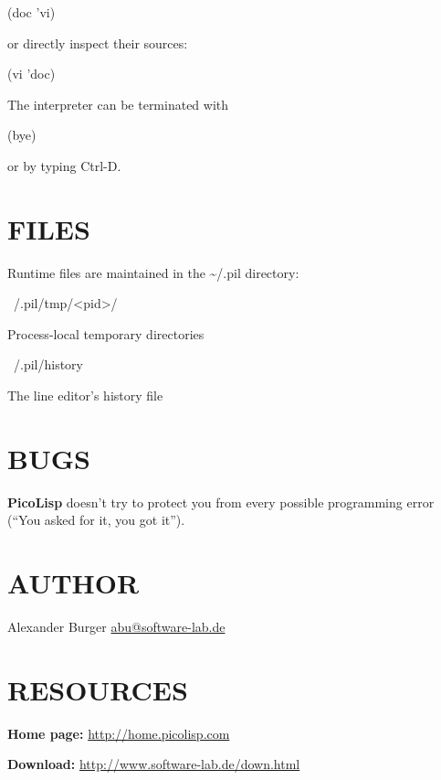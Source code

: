 \begin{wideverbatim}
 (doc 'vi)
\end{wideverbatim}

or directly inspect their sources:

\begin{wideverbatim}
 (vi 'doc)
\end{wideverbatim}

The interpreter can be terminated with

\begin{wideverbatim}
 (bye)
\end{wideverbatim}

or by typing Ctrl-D.

 
\section{FILES}
\label{sec:manpage-files}


Runtime files are maintained in the \~{}/.pil directory:

\begin{wideverbatim}
~{}/.pil/tmp/<pid>/
\end{wideverbatim}


Process-local temporary directories

\begin{wideverbatim}
~{}/.pil/history
\end{wideverbatim}

The line editor's history file

 
\section{BUGS}
\label{sec:manpage-bugs}


\textbf{PicoLisp} doesn't try to protect you from every possible programming
error (``You asked for it, you got it'').

 
\section{AUTHOR}
\label{sec:manpage-author}


Alexander Burger \href{mailto:abu@software-lab.de}{abu@software-lab.de}

 
\section{RESOURCES}
\label{sec:manpage-resources}


\textbf{Home page:}
\href{http://home.picolisp.com}{http://home.picolisp.com}

\textbf{Download:}
\href{http://www.software-lab.de/down.html}{http://www.software-lab.de/down.html}
